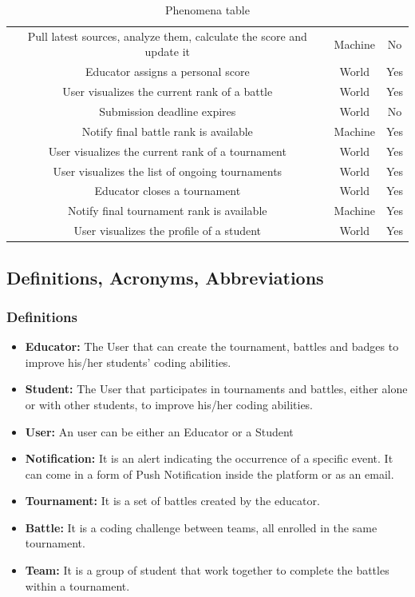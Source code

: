 \documentclass[12pt,oneside,a4paper]{article}
\begin{document}
\begin{table}[htbp]
\begin{adjustbox}{center}
\begin{tabular}{|c|c|c|}
        Pull latest sources, analyze them, calculate the score and update it & Machine & No\\
        Educator assigns a personal score & World & Yes\\
        User visualizes the current rank of a battle & World & Yes\\
        Submission deadline expires & World & No\\
        Notify final battle rank is available & Machine & Yes\\
        User visualizes the current rank of a tournament & World & Yes\\
        User visualizes the list of ongoing tournaments & World & Yes\\
        Educator closes a tournament & World & Yes\\
        Notify final tournament rank is available & Machine & Yes\\
        User visualizes the profile of a student & World & Yes\\ 
        \hline
    \end{tabular}
    \end{adjustbox}
    \caption{Phenomena table}
\end{table}


\subsection{Definitions, Acronyms, Abbreviations}
\subsubsection{Definitions}
\begin{itemize}
    \item \textbf{Educator:} The User that can create the tournament, battles and badges to improve his/her students' coding abilities.
    \item \textbf{Student:} The User that participates in tournaments and battles, either alone or with other students, to improve his/her coding abilities.
    \item \textbf{User:} An user can be either an Educator or a Student
    \item \textbf{Notification:} It is an alert indicating the occurrence of a specific event. It can come in a form of Push Notification inside the platform or as an email.
    \item \textbf{Tournament:} It is a set of battles created by the educator.
    \item \textbf{Battle:} It is a coding challenge between teams, all enrolled in the same tournament.
    \item \textbf{Team:} It is a group of student that work together to complete the battles within a tournament.
\end{itemize}
\end{document}
